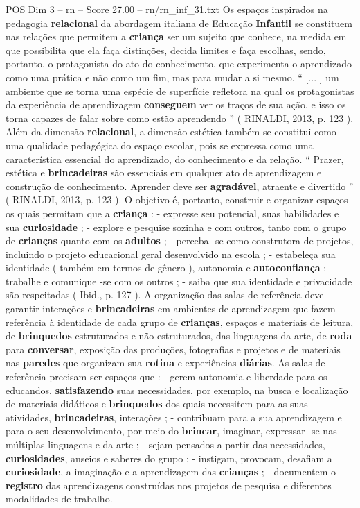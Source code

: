 \begin{textsample}{POS Dim 3 – rn – Score 27.00 – rn/rn\_inf\_31.txt}  \label{ex:f3_pos_093}
Os espaços inspirados na pedagogia \textbf{relacional} da abordagem italiana de Educação \textbf{Infantil} se constituem nas relações que permitem a \textbf{criança} ser um sujeito que conhece, na medida em que possibilita que ela faça distinções, decida limites e faça escolhas, sendo, portanto, o protagonista do ato do conhecimento, que experimenta o aprendizado como uma prática e não como um fim, mas para mudar a si mesmo. “ [... ] um ambiente que se torna uma espécie de superfície refletora na qual os protagonistas da experiência de aprendizagem \textbf{conseguem} ver os traços de sua ação, e isso os torna capazes de falar sobre como estão aprendendo ” ( RINALDI, 2013, p. 123 ).
Além da dimensão \textbf{relacional}, a dimensão estética também se constitui como uma qualidade pedagógica do espaço escolar, pois se expressa como uma característica essencial do aprendizado, do conhecimento e da relação. “ Prazer, estética e \textbf{brincadeiras} são essenciais em qualquer ato de aprendizagem e construção de conhecimento.
Aprender deve ser \textbf{agradável}, atraente e divertido ” ( RINALDI, 2013, p. 123 ).
O objetivo é, portanto, construir e organizar espaços os quais permitam que a \textbf{criança} : - expresse seu potencial, suas habilidades e sua \textbf{curiosidade} ; - explore e pesquise sozinha e com outros, tanto com o grupo de \textbf{crianças} quanto com os \textbf{adultos} ; - perceba -se como construtora de projetos, incluindo o projeto educacional geral desenvolvido na escola ; - estabeleça sua identidade ( também em termos de gênero ), autonomia e \textbf{autoconfiança} ; - trabalhe e comunique -se com os outros ; - saiba que sua identidade e privacidade são respeitadas ( Ibid., p. 127 ).
A organização das salas de referência deve garantir interações e \textbf{brincadeiras} em ambientes de aprendizagem que fazem referência à identidade de cada grupo de \textbf{crianças}, espaços e materiais de leitura, de \textbf{brinquedos} estruturados e não estruturados, das linguagens da arte, de \textbf{roda} para \textbf{conversar}, exposição das produções, fotografias e projetos e de materiais nas \textbf{paredes} que organizam sua \textbf{rotina} e experiências \textbf{diárias}.
As salas de referência precisam ser espaços que : - gerem autonomia e liberdade para os educandos, \textbf{satisfazendo} suas necessidades, por exemplo, na busca e localização de materiais didáticos e \textbf{brinquedos} dos quais necessitem para as suas atividades, \textbf{brincadeiras}, interações ; - contribuam para a sua aprendizagem e para o seu desenvolvimento, por meio do \textbf{brincar}, imaginar, expressar -se nas múltiplas linguagens e da arte ; - sejam pensados a partir das necessidades, \textbf{curiosidades}, anseios e saberes do grupo ; - instigam, provocam, desafiam a \textbf{curiosidade}, a imaginação e a aprendizagem das \textbf{crianças} ; - documentem o \textbf{registro} das aprendizagens construídas nos projetos de pesquisa e diferentes modalidades de trabalho.

\end{textsample}
